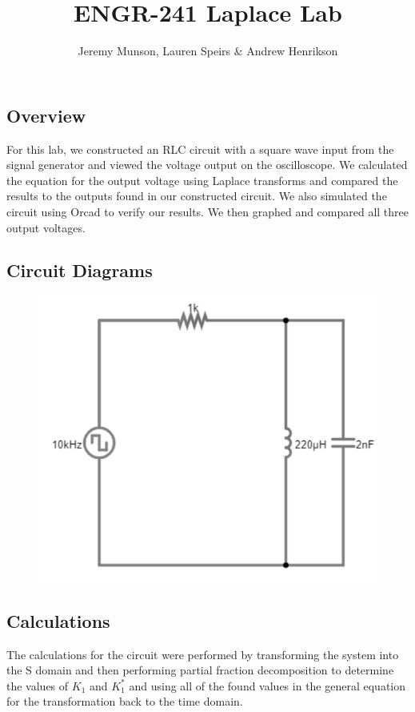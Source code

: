 \documentclass[11pt]{article}
\title{ENGR-241 Laplace Lab}
\author{Jeremy Munson, Lauren Speirs \& Andrew Henrikson}
\begin{document}
	\maketitle
	\subsection*{Overview}
	For this lab, we constructed an RLC circuit with a square wave input from the signal generator and viewed the voltage output on the oscilloscope. We calculated the equation for the output voltage using  Laplace transforms and compared the results to the outputs found in our constructed circuit. We also simulated the circuit using Orcad to verify our results. We then graphed and compared all three output voltages.
	\subsection*{Circuit Diagrams}
	
	\begin{figure}[H]
		\centering
		\includegraphics[width=5in]{images/basic diagram.png}
	\end{figure}
	
	\subsection*{Calculations}
	The calculations for the circuit were performed by transforming the system into the S domain and then performing partial fraction decomposition to determine the values of $K_{1}$ and $K^{*}_{1}$ and using all of the found values in the general equation for the transformation back to the time domain.
\end{document}
